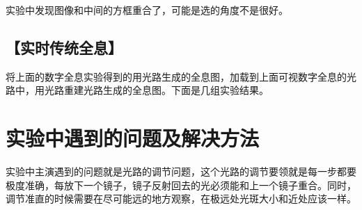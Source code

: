 \documentclass{ctexart}
\let\oldsubsection\subsection
\renewcommand{\subsection}[1]{\oldsubsection{\!\!\!\!\!\!【#1】}}
\begin{document}
实验中发现图像和中间的方框重合了，可能是选的角度不是很好。

\subsection{实时传统全息}

将上面的数字全息实验得到的用光路生成的全息图，加载到上面可视数字全息的光路中，用光路重建光路生成的全息图。下面是几组实验结果。


\section{实验中遇到的问题及解决方法}

实验中主演遇到的问题就是光路的调节问题，这个光路的调节要领就是每一步都要极度准确，每放下一个镜子，镜子反射回去的光必须能和上一个镜子重合。同时，调节准直的时候需要在尽可能远的地方观察，在极远处光斑大小和近处应该一样。
\end{document}

